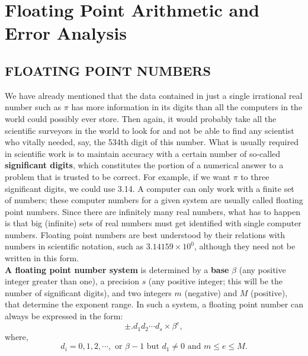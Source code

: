 \documentclass[../main.tex]{subfiles}
\begin{document}
\chapter{Floating Point Arithmetic and Error Analysis }

\section{FLOATING POINT NUMBERS }

We have already mentioned that the data contained in just a single irrational real number such as $\pi$ has more information in its digits than all the computers in the world could possibly ever store. Then again, it would probably take all the scientific surveyors in the world to look for and not be able to find any scientist who vitally needed, say, the 534th digit of this number. What is usually required in scientific work is to maintain accuracy with a certain number of so-called \textbf{significant digits}, which constitutes the portion of a numerical answer to a problem that is trusted to be correct. For example, if we want $\pi$ to three significant digits, we could use 3.14. A computer can only work with a finite set of numbers; these computer numbers for a given system are usually called floating point numbers. Since there are infinitely many real numbers, what has to happen is that big (infinite) sets of real numbers must get identified with single computer numbers. Floating point numbers are best understood by their relations with numbers in scientific notation, such as $3.14159 \times 10^{0}$, although they need not be written in this form.\\

\textbf{A floating point number system} is determined by a \textbf{base} $\beta$ (any positive integer greater than one), a precision $s$ (any positive integer; this will be the number of significant digits), and two integers $m$ (negative) and $M$ (positive), that determine the exponent range. In such a system, a floating point number can always be expressed in the form:
$$
\pm . d_{1} d_{2} \cdots d_{s} \times \beta^{e},
$$
where,
$$
d_{i}=0,1,2, \cdots, \text { or } \beta-1 \text { but } d_{1} \neq 0 \text { and } m \leq e \leq M .
$$
\end{document}
